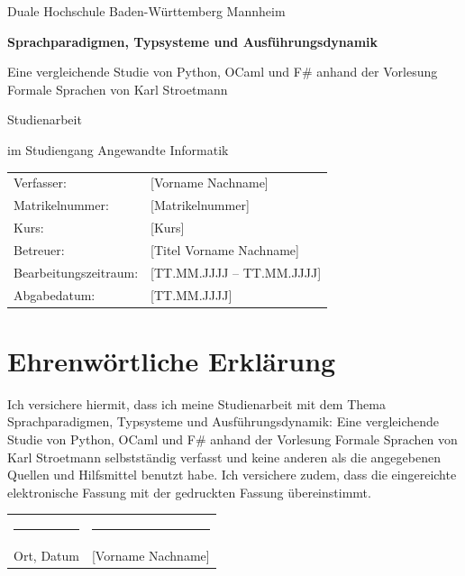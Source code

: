 \documentclass[
  12pt,
  a4paper,
  oneside,
  numbers=noenddot,
  chapterprefix=false,
  headings=normal,
  toc=listof,
  toc=bibliography,
  parskip=half-
]{scrreprt}
\newcommand{\arbeitTitel}{Sprachparadigmen, Typsysteme und Ausführungsdynamik}
\newcommand{\arbeitUntertitel}{Eine vergleichende Studie von Python, OCaml und F\# anhand der Vorlesung \glqq Formale Sprachen\grqq{} von Karl Stroetmann}
\newcommand{\arbeitArt}{Studienarbeit}
\newcommand{\studiengang}{Angewandte Informatik}
\newcommand{\verfasser}{[Vorname Nachname]}
\newcommand{\matrikelnummer}{[Matrikelnummer]}
\newcommand{\kurs}{[Kurs]}
\newcommand{\betreuer}{[Titel Vorname Nachname]}
\newcommand{\zeitraum}{[TT.MM.JJJJ -- TT.MM.JJJJ]}
\newcommand{\abgabedatum}{[TT.MM.JJJJ]}
\begin{document}
\begin{titlepage}
  \centering
  \singlespacing
  {\large Duale Hochschule Baden-Württemberg Mannheim\par}
  \vspace{4cm}
  {\LARGE\bfseries \arbeitTitel\par}
  \vspace{0.8cm}
  {\Large \arbeitUntertitel\par}
  \vspace{2.5cm}
  {\large \arbeitArt\par}
  \vspace{0.4cm}
  {\large im Studiengang \studiengang\par}
  \vfill
  \begin{tabular}{@{}ll@{}}
    Verfasser:            & \verfasser \\
    Matrikelnummer:       & \matrikelnummer \\
    Kurs:                 & \kurs \\
    Betreuer:             & \betreuer \\
    Bearbeitungszeitraum: & \zeitraum \\
    Abgabedatum:          & \abgabedatum \\
  \end{tabular}
\end{titlepage}


\chapter*{Ehrenwörtliche Erklärung}

Ich versichere hiermit, dass ich meine \arbeitArt{} mit dem Thema \glqq\arbeitTitel: \arbeitUntertitel\grqq{} selbstständig verfasst und keine anderen als die angegebenen Quellen und Hilfsmittel benutzt habe.
Ich versichere zudem, dass die eingereichte elektronische Fassung mit der gedruckten Fassung übereinstimmt.

\vspace{2cm}
\noindent\begin{tabular}{@{}p{6cm}p{7cm}@{}}
  \rule{5.5cm}{0.4pt} & \rule{6.5cm}{0.4pt} \\
  Ort, Datum & \verfasser \\
\end{tabular}
\end{document}
